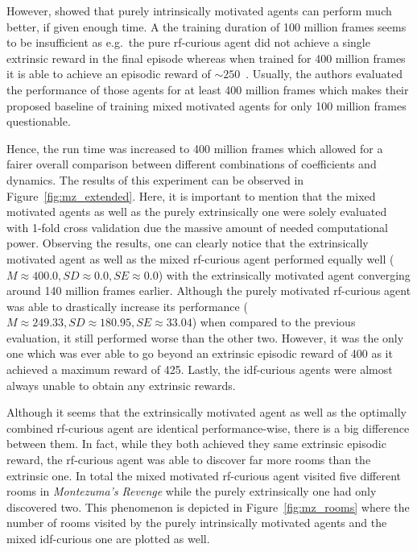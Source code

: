 \documentclass[draft,final]{vutinfth} %
\begin{document}
    However, \citet{burda_large-scale_2018-1} showed that purely intrinsically motivated agents can perform much better, if given enough time.
    A the training duration of 100 million frames seems to be insufficient as e.g.\ the pure \gls{rf}-curious agent did not achieve a single extrinsic reward in the final episode whereas when trained for 400 million frames it is able to achieve an episodic reward of $\sim250$~\citep[compare Figure 2]{burda_large-scale_2018-1}.
    Usually, the authors evaluated the performance of those agents for at least 400 million frames which makes their proposed baseline of training mixed motivated agents for only 100 million frames questionable.

    Hence, the run time was increased to 400 million frames which allowed for a fairer overall comparison between different combinations of coefficients and dynamics.
    The results of this experiment can be observed in Figure~\ref{fig:mz_extended}.
    Here, it is important to mention that the mixed motivated agents as well as the purely extrinsically one were solely evaluated with 1-fold cross validation due the massive amount of needed computational power.
    Observing the results, one can clearly notice that the extrinsically motivated agent as well as the mixed \gls{rf}-curious agent performed equally well ($M\approx400.0,SD\approx0.0,SE\approx0.0$) with the extrinsically motivated agent converging around 140 million frames earlier.
    Although the purely motivated \gls{rf}-curious agent was able to drastically increase its performance ($M\approx249.33,SD\approx180.95,SE\approx33.04$) when compared to the previous evaluation, it still performed worse than the other two.
    However, it was the only one which was ever able to go beyond an extrinsic episodic reward of 400 as it achieved a maximum reward of 425.
    Lastly, the \gls{idf}-curious agents were almost always unable to obtain any extrinsic rewards.

    Although it seems that the extrinsically motivated agent as well as the optimally combined \gls{rf}-curious agent are identical performance-wise, there is a big difference between them.
    In fact, while they both achieved they same extrinsic episodic reward, the \gls{rf}-curious agent was able to discover far more rooms than the extrinsic one.
    In total the mixed motivated \gls{rf}-curious agent visited five different rooms in \textit{Montezuma's Revenge} while the purely extrinsically one had only discovered two.
    This phenomenon is depicted in Figure~\ref{fig:mz_rooms} where the number of rooms visited by the purely intrinsically motivated agents and the mixed \gls{idf}-curious one are plotted as well.
\end{document}
